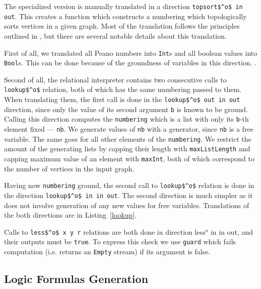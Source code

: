 The specialized version is manually translated in a direction \lstinline{topsort$^o$ in out}.
This creates a function which constructs a numbering which topologically sorts vertices in a given graph.
Most of the translation follows the principles outlined in , but there are several notable details about this translation.

First of all, we translated all Peano numbers into \lstinline{Int}s and all \mk boolean values into \lstinline{Bool}s.
This can be done because of the groundness of variables in this direction.
.

Second of all, the relational interpreter contains two consecutive calls to \lstinline{lookup$^o$} relation, both of which has the same numbering passed to them.
When translating them, the first call is done in the \lstinline{lookup$^o$ out in out} direction, since only the value of its second argument \lstinline{b} is known to be ground.
Calling this direction computes the \lstinline{numbering} which is a list with only its \lstinline{b}-th element fixed --- \lstinline{nb}.
We generate values of \lstinline{nb} with a generator, since \lstinline{nb} is a free variable.
The same goes for all other elements of the \lstinline{numbering}.
We restrict the amount of the generating lists by capping their length with \lstinline{maxListLength} and capping maximum value of an element with \lstinline{maxInt}, both of which correspond to the number of vertices in the input graph.

Having now \lstinline{numbering} ground, the second call to \lstinline{lookup$^o$} relation is done in the direction \lstinline{lookup$^o$ in in out}.
The second direction is much simpler as it does not involve generation of any new values for free variables.
Translations of the both directions are in Listing~\ref{lookup}.

Calls to \lstinline{less$^o$ x y r} relations are both done in direction {less$^o$ in in out}, and their outputs must be \lstinline{true}.
To express this check we use \lstinline{guard} which fails computation (i.e. returns an \lstinline{Empty} stream) if its argument is false.







\subsection{Logic Formulas Generation}

